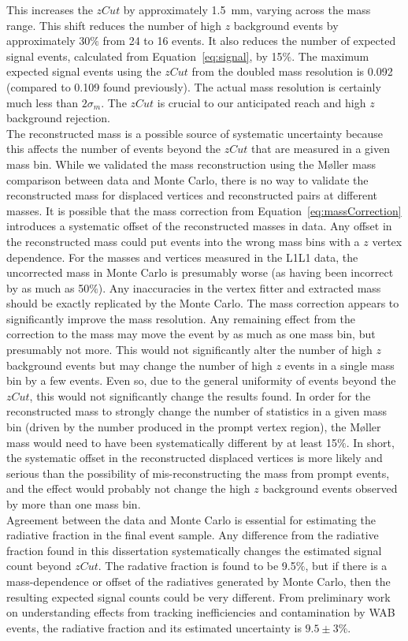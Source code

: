 This increases the $zCut$ by approximately 1.5~mm, varying across the mass range. This shift reduces the number of high $z$ background events by approximately 30$\%$ from 24 to 16 events. It also reduces the number of expected signal events, calculated from Equation~\eqref{eq:signal}, by 15$\%$. The maximum expected signal events using the $zCut$ from the doubled mass resolution is 0.092 (compared to 0.109 found previously). The actual mass resolution is certainly much less than $2\sigma_m$. The $zCut$ is crucial to our anticipated reach and high $z$ background rejection.\\
\indent The reconstructed mass is a possible source of systematic uncertainty because this affects the number of events beyond the $zCut$ that are measured in a given mass bin. While we validated the mass reconstruction using the M\o ller mass comparison between data and Monte Carlo, there is no way to validate the reconstructed mass for displaced vertices and reconstructed pairs at different masses. It is possible that the mass correction from Equation~\eqref{eq:massCorrection} introduces a systematic offset of the reconstructed masses in data. Any offset in the reconstructed mass could put events into the wrong mass bins with a $z$ vertex dependence. For the masses and vertices measured in the L1L1 data, the uncorrected mass in Monte Carlo is presumably worse (as having been incorrect by as much as 50$\%$). Any inaccuracies in the vertex fitter and extracted mass should be exactly replicated by the Monte Carlo. The mass correction appears to significantly improve the mass resolution. Any remaining effect from the correction to the mass may move the event by as much as one mass bin, but presumably not more. This would not significantly alter the number of high $z$ background events but may change the number of high $z$ events in a single mass bin by a few events. Even so, due to the general uniformity of events beyond the $zCut$, this would not significantly change the results found. In order for the reconstructed mass to strongly change the number of statistics in a given mass bin (driven by the number produced in the prompt vertex region), the M\o ller mass would need to have been systematically different by at least 15$\%$. In short, the systematic offset in the reconstructed displaced vertices is more likely and serious than the possibility of mis-reconstructing the mass from prompt events, and the effect would probably not change the high $z$ background events observed by more than one mass bin. \\
\indent Agreement between the data and Monte Carlo is essential for estimating the radiative fraction in the final event sample. Any difference from the radiative fraction found in this dissertation systematically changes the estimated signal count beyond $zCut$. The radative fraction is found to be 9.5$\%$, but if there is a mass-dependence or offset of the radiatives generated by Monte Carlo, then the resulting expected signal counts could be very different. From preliminary work on understanding effects from tracking inefficiencies and contamination by WAB events, the radiative fraction and its estimated uncertainty is $9.5\pm3\%$. 

